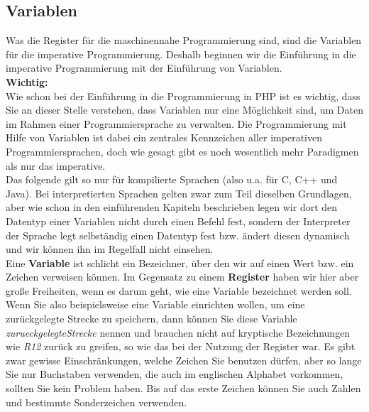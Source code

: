 \subsection{Variablen}

Was die Register für die maschinennahe Programmierung sind, sind die Variablen für die imperative Programmierung. Deshalb beginnen wir die Einführung in die imperative Programmierung mit der Einführung von Variablen.\\

\textbf{Wichtig:}\\

Wie schon bei der Einführung in die Programmierung in PHP ist es wichtig, dass Sie an dieser Stelle verstehen, dass Variablen nur eine Möglichkeit sind, um Daten im Rahmen einer Programmiersprache zu verwalten. Die Programmierung mit Hilfe von Variablen ist dabei ein zentrales Kennzeichen aller imperativen Programmiersprachen, doch wie gesagt gibt es noch wesentlich mehr Paradigmen als nur das imperative.\\

Das folgende gilt so nur für kompilierte Sprachen (also u.a. für C, C++ und Java). Bei interpretierten Sprachen gelten zwar zum Teil dieselben Grundlagen, aber wie schon in den einführenden Kapiteln beschrieben legen wir dort den Datentyp einer Variablen nicht durch einen \glqq{}Befehl\grqq{} fest, sondern der Interpreter der Sprache legt selbständig einen Datentyp fest bzw. ändert diesen dynamisch und wir können ihn im Regelfall nicht einsehen.\\

Eine \textbf{Variable} ist schlicht ein Bezeichner, über den wir auf einen Wert bzw. ein Zeichen verweisen können. Im Gegensatz zu einem \textbf{Register} haben wir hier aber große Freiheiten, wenn es darum geht, wie eine Variable bezeichnet werden soll. Wenn Sie also beispielsweise eine Variable einrichten wollen, um eine zurückgelegte Strecke zu speichern, dann können Sie diese Variable \emph{zurueckgelegteStrecke} nennen und brauchen nicht auf kryptische Bezeichnungen wie \emph{R12} zurück zu greifen, so wie das bei der Nutzung der Register war. Es gibt zwar gewisse Einschränkungen, welche Zeichen Sie benutzen dürfen, aber so lange Sie nur Buchstaben verwenden, die auch im englischen Alphabet vorkommen, sollten Sie kein Problem haben. Bis auf das erste Zeichen können Sie auch Zahlen und bestimmte Sonderzeichen verwenden.\\

